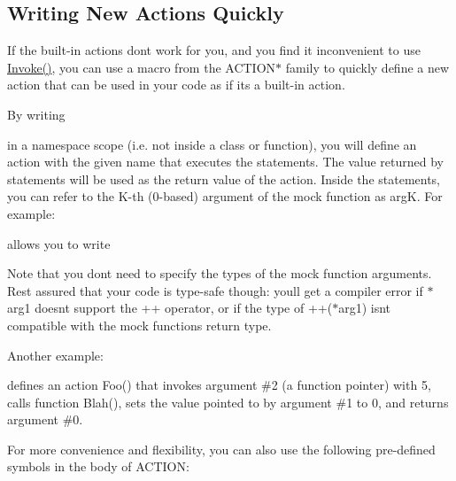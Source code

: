 \subsection*{Writing New Actions Quickly}

If the built-\/in actions don\textquotesingle{}t work for you, and you find it inconvenient to use {\ttfamily \mbox{\hyperlink{namespacetesting_af5cacf4475557b5a3e37af3836564235}{Invoke()}}}, you can use a macro from the {\ttfamily A\+C\+T\+I\+O\+N$\ast$} family to quickly define a new action that can be used in your code as if it\textquotesingle{}s a built-\/in action.

By writing 
\begin{DoxyCode}{0}
\end{DoxyCode}
 in a namespace scope (i.\+e. not inside a class or function), you will define an action with the given name that executes the statements. The value returned by {\ttfamily statements} will be used as the return value of the action. Inside the statements, you can refer to the K-\/th (0-\/based) argument of the mock function as {\ttfamily argK}. For example\+: 
\begin{DoxyCode}{0}
\end{DoxyCode}
 allows you to write 
\begin{DoxyCode}{0}
\end{DoxyCode}


Note that you don\textquotesingle{}t need to specify the types of the mock function arguments. Rest assured that your code is type-\/safe though\+: you\textquotesingle{}ll get a compiler error if {\ttfamily $\ast$arg1} doesn\textquotesingle{}t support the {\ttfamily ++} operator, or if the type of {\ttfamily ++($\ast$arg1)} isn\textquotesingle{}t compatible with the mock function\textquotesingle{}s return type.

Another example\+: 
\begin{DoxyCode}{0}
\DoxyCodeLine{\}}
\end{DoxyCode}
 defines an action {\ttfamily Foo()} that invokes argument \#2 (a function pointer) with 5, calls function {\ttfamily Blah()}, sets the value pointed to by argument \#1 to 0, and returns argument \#0.

For more convenience and flexibility, you can also use the following pre-\/defined symbols in the body of {\ttfamily A\+C\+T\+I\+ON}\+:

